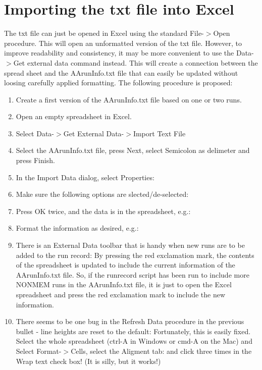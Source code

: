 \documentclass[a4paper,12pt]{article}
\begin{document}
\section{Importing the txt file into Excel}
The txt file can just be opened in Excel using the standard File-$>$Open procedure. This will open an unformatted version of the txt file. However, to improve readability and consistency, it may be more convenient to use the Data-$>$Get external data command instead. This will create a connection between the spread sheet and the AArunInfo.txt file that can easily be updated without loosing carefully applied formatting. The following procedure is proposed:
\begin{enumerate}
	\item Create a first version of the AArunInfo.txt file based on one or two runs.
	\item Open an empty spreadsheet in Excel.
	\item Select Data-$>$Get External Data-$>$Import Text File
	\item Select the AArunInfo.txt file, press Next, select Semicolon as delimeter and press Finish.
	\item In the Import Data dialog, select Properties:
	\item Make sure the following options are slected/de-selected:
	\item Press OK twice, and the data is in the spreadsheet, e.g.:
	\item Format the information as desired, e.g.:
	\item There is an External Data toolbar that is handy when new runs are to be added to the run record:
By pressing the red exclamation mark, the contents of the spreadsheet is updated to include the current information of the AArunInfo.txt file. So, if the runrecord script has been run to include more NONMEM runs in the AArunInfo.txt file, it is just to open the Excel spreadsheet and press the red exclamation mark to include the new information.
	\item There seems to be one bug in the Refresh Data procedure in the previous bullet - line heights are reset to the default:
Fortunately, this is easily fixed. Select the whole spreadsheet (ctrl-A in Windows or cmd-A on the Mac) and Select Format-$>$Cells, select the Aligment tab:
and click three times in the Wrap text check box! (It is silly, but it works!)
\end{enumerate}
\end{document}
